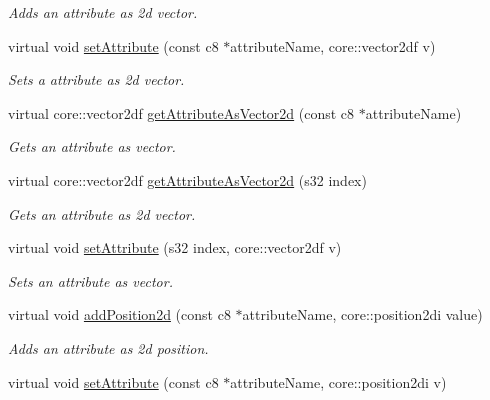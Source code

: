 \begin{DoxyCompactItemize}
\begin{DoxyCompactList}\small\item\em Adds an attribute as 2d vector. \end{DoxyCompactList}\item 
virtual void \hyperlink{classirr_1_1io_1_1_c_attributes_a525e249eb1a52f594b9378177d2fc6e0}{set\-Attribute} (const c8 $\ast$attribute\-Name, core\-::vector2df v)
\begin{DoxyCompactList}\small\item\em Sets a attribute as 2d vector. \end{DoxyCompactList}\item 
virtual core\-::vector2df \hyperlink{classirr_1_1io_1_1_c_attributes_a5bd20f337412c2fd6c6b94b5790179cd}{get\-Attribute\-As\-Vector2d} (const c8 $\ast$attribute\-Name)
\begin{DoxyCompactList}\small\item\em Gets an attribute as vector. \end{DoxyCompactList}\item 
virtual core\-::vector2df \hyperlink{classirr_1_1io_1_1_c_attributes_a7855e10e87198ab03ee8422ee4ae98b4}{get\-Attribute\-As\-Vector2d} (s32 index)
\begin{DoxyCompactList}\small\item\em Gets an attribute as 2d vector. \end{DoxyCompactList}\item 
virtual void \hyperlink{classirr_1_1io_1_1_c_attributes_a4ac7f976c6a30364fb2d21da286d0d4a}{set\-Attribute} (s32 index, core\-::vector2df v)
\begin{DoxyCompactList}\small\item\em Sets an attribute as vector. \end{DoxyCompactList}\item 
\hypertarget{classirr_1_1io_1_1_c_attributes_a9a1f72f32d8c5f83c27807c71bd1006a}{virtual void \hyperlink{classirr_1_1io_1_1_c_attributes_a9a1f72f32d8c5f83c27807c71bd1006a}{add\-Position2d} (const c8 $\ast$attribute\-Name, core\-::position2di value)}\label{classirr_1_1io_1_1_c_attributes_a9a1f72f32d8c5f83c27807c71bd1006a}

\begin{DoxyCompactList}\small\item\em Adds an attribute as 2d position. \end{DoxyCompactList}\item 
\hypertarget{classirr_1_1io_1_1_c_attributes_a4ec4a47670e57b206a93d09400b7e834}{virtual void \hyperlink{classirr_1_1io_1_1_c_attributes_a4ec4a47670e57b206a93d09400b7e834}{set\-Attribute} (const c8 $\ast$attribute\-Name, core\-::position2di v)}\label{classirr_1_1io_1_1_c_attributes_a4ec4a47670e57b206a93d09400b7e834}


\end{DoxyCompactItemize}
